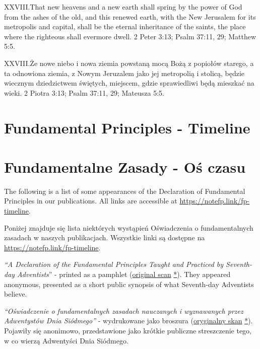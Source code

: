 \lettrine{XXVIII.} That new heavens and a new earth shall spring by the power of God from the ashes of the old, and this renewed earth, with the New Jerusalem for its metropolis and capital, shall be the eternal inheritance of the saints, the place where the righteous shall evermore dwell. 2 Peter 3:13; Psalm 37:11, 29; Matthew 5:5.


\lettrine{XXVIII.} Że nowe niebo i nowa ziemia powstaną mocą Bożą z popiołów starego, a ta odnowiona ziemia, z Nowym Jeruzalem jako jej metropolią i stolicą, będzie wiecznym dziedzictwem świętych, miejscem, gdzie sprawiedliwi będą mieszkać na wieki. 2 Piotra 3:13; Psalm 37:11, 29; Mateusza 5:5.


\section*{Fundamental Principles - Timeline} \label{appendix:timeline}


\section*{Fundamentalne Zasady - Oś czasu} \label{appendix:timeline}


The following is a list of some appearances of the Declaration of Fundamental Principles in our publications. All links are accessible at \href{https://notefp.link/fp-timeline}{https://notefp.link/fp-timeline}.


Poniżej znajduje się lista niektórych wystąpień Oświadczenia o fundamentalnych zasadach w naszych publikacjach. Wszystkie linki są dostępne na \href{https://notefp.link/fp-timeline}{https://notefp.link/fp-timeline}.






\textit{“A Declaration of the Fundamental Principles Taught and Practiced by Seventh-day Adventists}” - printed as a pamphlet (\href{https://adventistdigitallibrary.org/islandora/object/adl:366607?link_only=true}{original scan} \href{https://forgotten-pillar.s3.us-east-2.amazonaws.com/A+declaration+of+the+fundamental+principles+taught+and+practiced+by+the+Seventh-day+Adventists++.pdf}{*}). They appeared anonymous, presented as a short public synopsis of what Seventh-day Adventists believe.


\textit{“Oświadczenie o fundamentalnych zasadach nauczanych i wyznawanych przez Adwentystów Dnia Siódmego”} - wydrukowane jako broszura (\href{https://adventistdigitallibrary.org/islandora/object/adl:366607?link_only=true}{oryginalny skan} \href{https://forgotten-pillar.s3.us-east-2.amazonaws.com/A+declaration+of+the+fundamental+principles+taught+and+practiced+by+the+Seventh-day+Adventists++.pdf}{*}). Pojawiły się anonimowo, przedstawione jako krótkie publiczne streszczenie tego, w co wierzą Adwentyści Dnia Siódmego.


